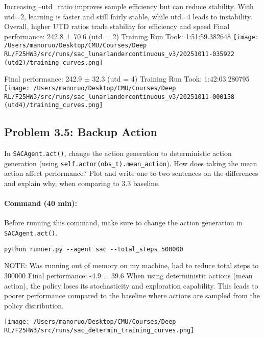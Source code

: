 \documentclass[12pt]{article}
\begin{document}
\begin{solution}[height=15cm]

Increasing --utd_ratio improves sample efficiency but can reduce stability. 
With utd=2, learning is faster and still fairly stable, while utd=4 leads to instability.
Overall, higher UTD ratios trade stability for efficiency and speed
\newline\newline
Final performance: 242.8 ± 70.6 (utd = 2)
Training Run Took: 1:51:59.382648
 \centering
    \texttt{[image: /Users/manoruo/Desktop/CMU/Courses/Deep RL/F25HW3/src/runs/sac\_lunarlandercontinuous\_v3/20251011-035922 (utd2)/training\_curves.png]}
    \label{fig:sac_utd2}

Final performance: 242.9 ± 32.3 (utd = 4)
Training Run Took: 1:42:03.280795
 \centering
    \texttt{[image: /Users/manoruo/Desktop/CMU/Courses/Deep RL/F25HW3/src/runs/sac\_lunarlandercontinuous\_v3/20251011-000158 (utd4)/training\_curves.png]}
    \label{fig:sac_utd4}

\end{solution}

\subsection*{Problem 3.5: Backup Action}

In \texttt{SACAgent.act()}, change the action generation to deterministic action generation (using \texttt{self.actor(obs_t).mean\_action}). How does taking the mean action affect performance? Plot and write one to two sentences on the differences and explain why, when comparing to 3.3 baseline.

\paragraph{Command (40 min):} Before running this command, make sure to change the action generation in  \texttt{SACAgent.act()}.
\begin{verbatim}
python runner.py --agent sac --total_steps 500000
\end{verbatim}

\begin{solution}[height=15cm]

NOTE: Was running out of memory on my machine, had to reduce total steps to 300000
\newline\newline
Final performance: -4.9 ± 39.6
\newline\newline
When using deterministic actions (mean action), the policy loses its stochasticity and exploration capability.
This leads to poorer performance compared to the baseline where actions are sampled from the policy distribution.

 \centering
    \texttt{[image: /Users/manoruo/Desktop/CMU/Courses/Deep RL/F25HW3/src/runs/sac\_determin\_training\_curves.png]}
    \label{fig:sac_deter}
\end{solution}
\end{document}
